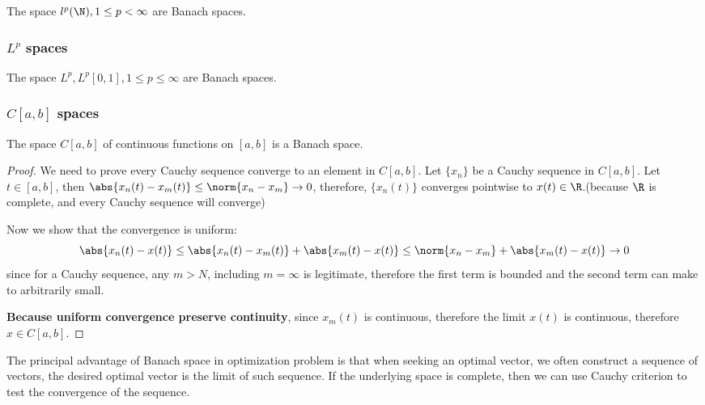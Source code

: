 \begin{refsection}
\begin{theorem}
\cite[50]{christensen2010functions} The space $l^p(\N),1\leq p < \infty$ are Banach spaces. 
\end{theorem}




\subsubsection{$L^p$ spaces}


\begin{theorem}\cite[95]{christensen2010functions}
	 The space $L^p,L^p[0,1],1\leq p \leq \infty$ are Banach spaces. 
\end{theorem}


\subsubsection{$C[a,b]$ spaces}

\begin{lemma}
	\cite[35]{luenberger1969optimization}
	The space $C[a,b]$ of continuous functions on $[a,b]$ is a Banach space.
\end{lemma}
\begin{proof}
We need to prove every Cauchy sequence converge to an element in $C[a,b]$. Let $\{x_n\}$ be a Cauchy sequence in $C[a,b]$. Let $t\in [a,b]$, then $\abs{x_n(t) - x_m(t)} \leq \norm{x_n-x_m} \to 0$, therefore, $\{x_n(t)\}$ converges pointwise to $x(t) \in \R$.(because $\R$ is complete, and every Cauchy sequence will converge) 

Now we show that the convergence is uniform: $$\abs{x_n(t) - x(t)} \leq \abs{x_n(t) - x_m(t)} + \abs{x_m(t) - x(t)} \leq \norm{x_n-x_m} + \abs{x_m(t) - x(t)} \to 0$$
since for a Cauchy sequence, any $m > N$, including $m=\infty$ is legitimate, therefore the first term is bounded and the second term can make to arbitrarily small.

\textbf{Because uniform convergence preserve continuity}, since $x_m(t)$ is continuous, therefore the limit $x(t)$ is continuous, therefore $x \in C[a,b]$.	
\end{proof}





\begin{remark}\cite[35]{luenberger1969optimization}
The principal advantage of Banach space in optimization problem is that when seeking an optimal vector, we often construct a sequence of vectors, the desired optimal vector is the limit of such sequence. If the underlying space is complete, then we can use Cauchy criterion to test the convergence of the sequence.	
\end{remark}
 






\end{refsection}
